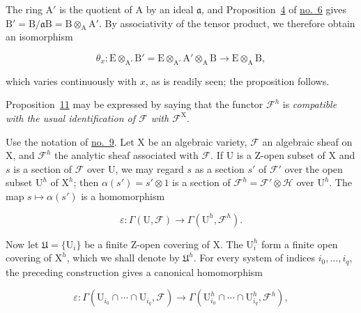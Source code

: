The ring $\mathrm{A}'$ is the quotient of $\mathrm{A}$ by an ideal $\mathfrak{a}$, and Proposition~\hyperref[gaga:prop:4]{4} of \hyperref[gaga:no:6]{no.~6} gives $\mathrm{B}'=\mathrm{B}/\mathfrak{a}\mathrm{B}=\mathrm{B}\otimes_\mathrm{A}\mathrm{A}'$. By associativity of the tensor product, we therefore obtain an isomorphism

\begin{equation*}
\theta_x:\mathrm{E}\otimes_{\mathrm{A}'}\mathrm{B}'=\mathrm{E}\otimes_{\mathrm{A}'}\mathrm{A}'\otimes_\mathrm{A}\mathrm{B}\longrightarrow \mathrm{E}\otimes_\mathrm{A}\mathrm{B},
\end{equation*}

which varies continuously with $x$, as is readily seen; the proposition follows.

Proposition~\hyperref[gaga:prop:11]{11} may be expressed by saying that the functor $\mathcal{F}^h$ is \emph{compatible with the usual identification of $\mathcal{F}$ with $\mathcal{F}^\mathrm{X}$}.


Use the notation of \hyperref[gaga:no:9]{no.~9}. Let $\mathrm{X}$ be an algebraic variety, $\mathcal{F}$ an algebraic sheaf on $\mathrm{X}$, and $\mathcal{F}^h$ the analytic sheaf associated with $\mathcal{F}$. If $\mathrm{U}$ is a Z-open subset of $\mathrm{X}$ and $s$ is a section of $\mathcal{F}$ over $\mathrm{U}$, we may regard $s$ as a section $s'$ of $\mathcal{F}'$ over the open subset $\mathrm{U}^h$ of $\mathrm{X}^h$; then $\alpha(s')=s'\otimes1$ is a section of $\mathcal{F}^h=\mathcal{F}'\otimes\mathcal{H}$ over $\mathrm{U}^h$. The map $s\mapsto\alpha(s')$ is a homomorphism

\begin{equation*}
\varepsilon:\Gamma(\mathrm{U},\mathcal{F})\longrightarrow\Gamma(\mathrm{U}^h,\mathcal{F}^h).
\end{equation*}

Now let $\mathfrak{U}=\{\mathrm{U}_i\}$ be a finite Z-open covering of $\mathrm{X}$. The $\mathrm{U}_i^h$ form a finite open covering of $\mathrm{X}^h$, which we shall denote by $\mathfrak{U}^h$. For every system of indices $i_0,\ldots,i_q$, the preceding construction gives a canonical homomorphism

\begin{equation*}
\varepsilon:\Gamma(\mathrm{U}_{i_0}\cap\cdots\cap \mathrm{U}_{i_q},\mathcal{F})
\longrightarrow
\Gamma(\mathrm{U}^h_{i_0}\cap\cdots\cap \mathrm{U}^h_{i_q},\mathcal{F}^h),
\end{equation*}

